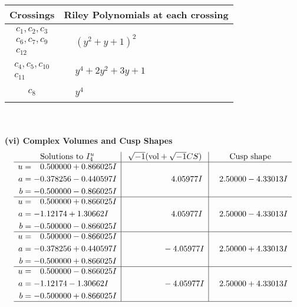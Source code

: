 \documentclass[1p]{elsarticle_modified}
\theoremstyle{definition}
\newcommand{\I}{\sqrt{-1}}
\begin{document}
\begin{tabular}{m{50pt}|m{274pt}}
Crossings & \hspace{64pt}Riley Polynomials at each crossing \\
\hline $$\begin{aligned}c_{1},c_{2},c_{3}\\c_{6},c_{7},c_{9}\\c_{12}\end{aligned}$$&$\begin{aligned}
&(y^2+y+1)^2
\end{aligned}$\\
\hline $$\begin{aligned}c_{4},c_{5},c_{10}\\c_{11}\end{aligned}$$&$\begin{aligned}
&y^4+2 y^2+3 y+1
\end{aligned}$\\
\hline $$\begin{aligned}c_{8}\end{aligned}$$&$\begin{aligned}
&y^4
\end{aligned}$\\
\hline
\end{tabular}\\~\\
\newpage\flushleft \textbf{(vi) Complex Volumes and Cusp Shapes}
$$\begin{array}{c|c|c}  
\text{Solutions to }I^u_{4}& \I (\text{vol} + \sqrt{-1}CS) & \text{Cusp shape}\\
 \hline 
\begin{aligned}
u &= \phantom{-}0.500000 + 0.866025 I \\
a &= -0.378256 - 0.440597 I \\
b &= -0.500000 - 0.866025 I\end{aligned}
 & \phantom{-0.000000 -}4.05977 I & \phantom{-}2.50000 - 4.33013 I \\ \hline\begin{aligned}
u &= \phantom{-}0.500000 + 0.866025 I \\
a &= -1.12174 + 1.30662 I \\
b &= -0.500000 - 0.866025 I\end{aligned}
 & \phantom{-0.000000 -}4.05977 I & \phantom{-}2.50000 - 4.33013 I \\ \hline\begin{aligned}
u &= \phantom{-}0.500000 - 0.866025 I \\
a &= -0.378256 + 0.440597 I \\
b &= -0.500000 + 0.866025 I\end{aligned}
 & \phantom{-0.000000 } -4.05977 I & \phantom{-}2.50000 + 4.33013 I \\ \hline\begin{aligned}
u &= \phantom{-}0.500000 - 0.866025 I \\
a &= -1.12174 - 1.30662 I \\
b &= -0.500000 + 0.866025 I\end{aligned}
 & \phantom{-0.000000 } -4.05977 I & \phantom{-}2.50000 + 4.33013 I\\
 \hline 
 \end{array}$$\newpage\newpage\renewcommand{\arraystretch}{1}
\end{document}

